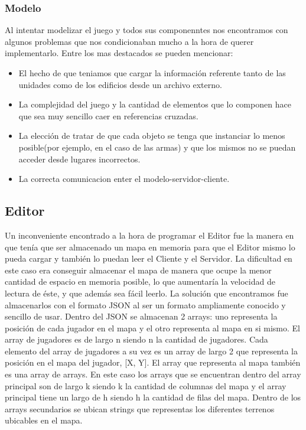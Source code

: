 \documentclass[titlepage,a4paper,12pt]{article}
\begin{document}
\subsubsection{Modelo}
Al intentar modelizar el juego y todos sus componenntes nos encontramos con algunos problemas que nos condicionaban mucho a la hora de querer implementarlo. Entre los mas destacados se pueden mencionar:
\begin{itemize}
\item El hecho de que teniamos que cargar la información referente tanto de las unidades como de los edificios desde un archivo externo.
\item La complejidad del juego y la cantidad de elementos que lo componen hace que sea muy sencillo caer en referencias cruzadas.
\item La elección de tratar de que cada objeto se tenga que instanciar lo menos posible(por ejemplo, en el caso de las armas) y que los mismos no se puedan acceder desde lugares incorrectos.
\item La correcta comunicacion enter el modelo-servidor-cliente. 
\end{itemize}

\subsection{Editor}

Un inconveniente encontrado a la hora de programar el Editor fue la manera en que tenía que ser almacenado un mapa en memoria para que el Editor mismo lo pueda cargar y también lo puedan leer el Cliente y el Servidor. La dificultad en este caso era conseguir almacenar el mapa de manera que ocupe la menor cantidad de espacio en memoria posible, lo que aumentaría la velocidad de lectura de éste, y que además sea fácil leerlo. La solución que encontramos fue almacenarlos con el formato JSON al ser un formato ampliamente conocido y sencillo de usar. Dentro del JSON se almacenan 2 arrays: uno representa la posición de cada jugador en el mapa y el otro representa al mapa en si mismo. El array de jugadores es de largo n siendo n la cantidad de jugadores. Cada elemento del array de jugadores a su vez es un array de largo 2 que representa la posición en el mapa del jugador, [X, Y]. El array que representa al mapa también es una array de arrays. En este caso los arrays que se encuentran dentro del array principal son de largo k siendo k la cantidad de columnas del mapa y el array principal tiene un largo de h siendo h la cantidad de filas del mapa. Dentro de los arrays secundarios se ubican strings que representas los diferentes terrenos ubicables en el mapa.
\end{document}
